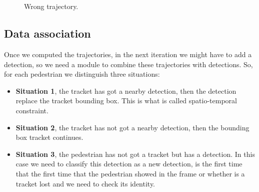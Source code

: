 \documentclass[12pt, a4paper, titlepage,twoside,openright]{article}
\begin{document}
\begin{figure}[H]
		
\centering

\\
\\
\caption{Wrong trajectory.}
\label{motion2nocoorrect}
\end{figure}





\subsection{Data association}


Once we computed the trajectories, in the next iteration we might have to add a detection, so we need a module to combine these trajectories with detections. So, for each pedestrian we distinguish three situations:

\begin{itemize}



\item \textbf{Situation 1}, the tracket has got a nearby detection, then the detection replace the tracket bounding box. This is what is called spatio-temporal constraint.

\item \textbf{Situation 2}, the tracket has not got a nearby detection, then the bounding box tracket continues.

\item \textbf{Situation 3}, the pedestrian has not got a tracket but has a detection. In this case we need to classify this detection as a new detection, is the first time that the first time that the pedestrian showed in the frame or whether is a tracket lost and we need to check its identity.

\end{itemize}
\end{document}
